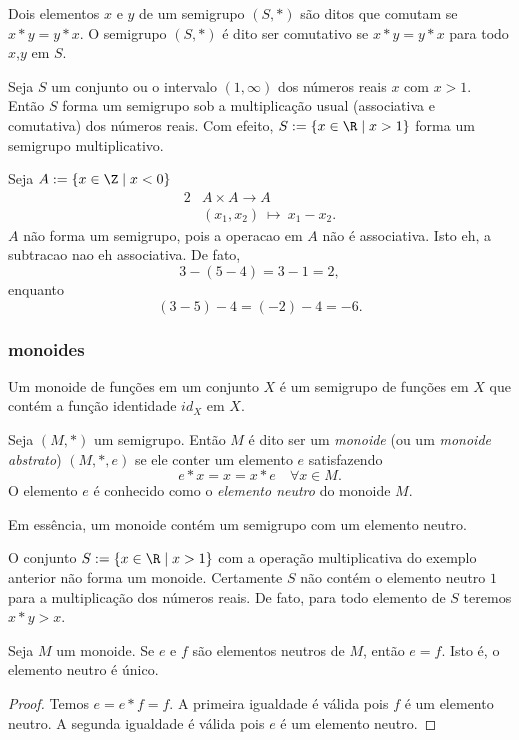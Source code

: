       \begin{definition}[Comutatividade]
         Dois elementos $x$ e $y$ de um semigrupo $(S, *)$ são ditos que comutam se $x* y = y* x$. O semigrupo $(S, *)$ é dito ser comutativo se $x* y = y * x$ para todo $x$,$y$ em $S$.
      \end{definition}
      \begin{exmp}
         Seja $S$ um conjunto ou o intervalo $(1,\infty)$ dos números reais $x$ com $x > 1$. Então $S$ forma um semigrupo sob a multiplicação usual (associativa e comutativa) dos números reais.
         Com efeito, $S := \{x \in \R \mid x > 1\}$ forma um semigrupo multiplicativo.
      \end{exmp}
      \begin{exmp}
         Seja $A:= \{x \in \Z \mid x < 0\}$
         \begin{alignat}{2}
            &A \times A \to A \nonumber\\
            &\left(x_{1},x_{2}\right)\ \mapsto\ x_{1} - x_{2}.
            \nonumber
         \end{alignat}
         $A$ não forma um semigrupo, pois a operacao em $A$ não é associativa. Isto eh, a subtracao nao eh associativa. De fato, $$3-(5-4)=3-1=2,$$ enquanto $$(3-5)-4=(-2)-4=-6.$$
      \end{exmp}

      \subsubsection{monoides}
         Um monoide de funções em um conjunto $X$ é um semigrupo de funções em $X$ que contém a função identidade $id_{X}$ em $X$.
         \begin{definition}
            Seja $(M, *)$ um semigrupo. Então $M$ é dito ser um \emph{monoide} (ou um \emph{monoide abstrato}) $(M, *, e)$ se ele conter um elemento $e$ satisfazendo $$e * x = x = x * e\quad \forall x \in M.$$ O elemento $e$ é conhecido como o \textit{elemento neutro} do monoide $M$.
         \end{definition}
         Em essência, um monoide contém um semigrupo com um elemento neutro.
         \begin{exmp}
            O conjunto $S := \{x \in \R \mid x > 1\}$ com a operação multiplicativa do exemplo anterior não forma um monoide. Certamente $S$ não contém o elemento neutro $1$ para a multiplicação dos números reais. De fato, para todo elemento de $S$ teremos $x * y > x$.
         \end{exmp}
         \begin{stat}
            Seja $M$ um monoide. Se $e$ e $f$ são elementos neutros de $M$, então $e=f$. Isto é, o elemento neutro é único.
            \begin{proof}
               Temos $e = e * f = f$. A primeira igualdade é válida pois $f$ é um elemento neutro. A segunda igualdade é válida pois $e$ é um elemento neutro.
            \end{proof}
         \end{stat}

